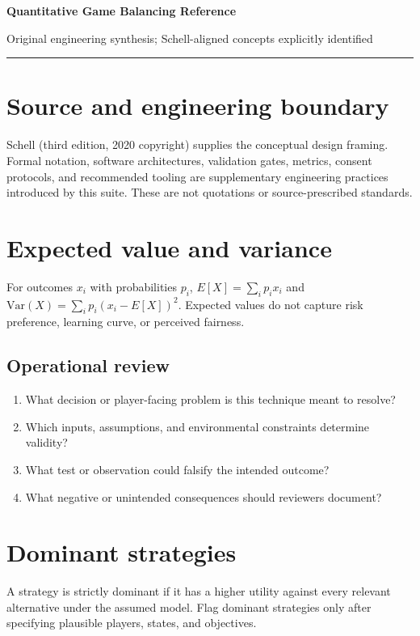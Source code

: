 \documentclass[11pt]{article}
\begin{document}
{\huge\bfseries\color{suiteblue} Quantitative Game Balancing Reference}\par
\vspace{0.15in}
{\normalsize\color{suitegray} Original engineering synthesis; Schell-aligned concepts explicitly identified}\par
\vspace{0.15in}\hrule\vspace{0.15in}

\section{Source and engineering boundary}
Schell (third edition, 2020 copyright) supplies the conceptual design framing. Formal notation, software architectures, validation gates, metrics, consent protocols, and recommended tooling are supplementary engineering practices introduced by this suite. These are not quotations or source-prescribed standards.


\section{Expected value and variance}
For outcomes $x_i$ with probabilities $p_i$, $E[X]=\sum_i p_ix_i$ and $\mathrm{Var}(X)=\sum_i p_i(x_i-E[X])^2$. Expected values do not capture risk preference, learning curve, or perceived fairness.


\subsection{Operational review}
\begin{enumerate}
\item What decision or player-facing problem is this technique meant to resolve?
\item Which inputs, assumptions, and environmental constraints determine validity?
\item What test or observation could falsify the intended outcome?
\item What negative or unintended consequences should reviewers document?
\end{enumerate}

\section{Dominant strategies}
A strategy is strictly dominant if it has a higher utility against every relevant alternative under the assumed model. Flag dominant strategies only after specifying plausible players, states, and objectives.
\end{document}
